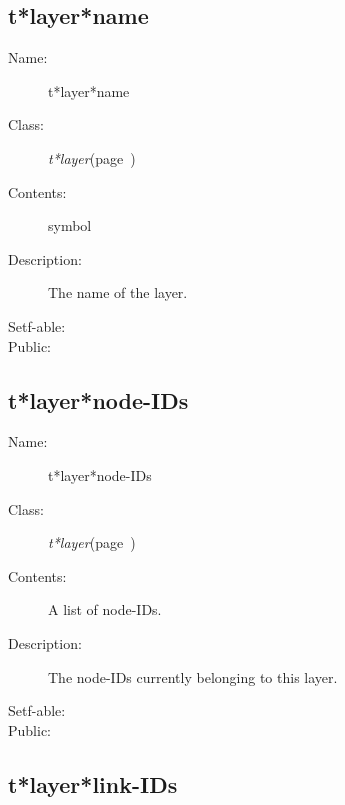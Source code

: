 \subsection{t*layer*name}
\label{t*layer*name}

\begin{description}
\item [Name:]  t*layer*name

\item [Class:] {\sl t*layer}\hfill(page~\pageref{t*layer})

\item [Contents:]
symbol

\item [Description:]
The name of the layer.

\item [Setf-able:]


\item [Public:]



\end{description}
\horizontalline

\subsection{t*layer*node-IDs}
\label{t*layer*node-IDs}

\begin{description}
\item [Name:]  t*layer*node-IDs

\item [Class:] {\sl t*layer}\hfill(page~\pageref{t*layer})

\item [Contents:]
A list of node-IDs.

\item [Description:]

The node-IDs currently belonging to this layer.

\item [Setf-able:]


\item [Public:]



\end{description}
\horizontalline

\subsection{t*layer*link-IDs}
\label{t*layer*link-IDs}

